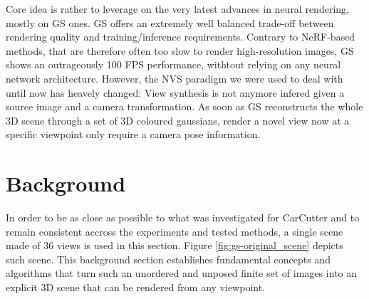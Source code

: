 Core idea is rather to leverage on the very latest advances in neural rendering, mostly on \ac{GS} ones. \ac{GS} offers an extremely well balanced trade-off between rendering quality and training/inference requirements. Contrary to \ac{NeRF}-based methods, that are therefore often too slow to render high-resolution images, \ac{GS} shows an outrageously 100 \ac{FPS} performance, withtout relying on any neural network architecture. However, the \ac{NVS} paradigm we were used to deal with until now has heavely changed: View synthesis is not anymore infered given a source image and a camera transformation. As soon as \ac{GS} reconstructs the whole 3D scene through a set of 3D coloured gaussians, render a novel view now at a specific viewpoint only require a camera pose information.


\section{Background}
In order to be as close as possible to what was investigated for CarCutter and to remain consistent accross the experiments and tested methods, a single scene made of 36 views is used in this section. Figure \ref{fig:gs-original_scene} depicts such scene. This background section establishes fundamental concepts and algorithms that turn such an unordered and unposed finite set of images into an explicit 3D scene that can be rendered from any viewpoint. 

